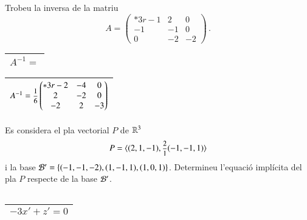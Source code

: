 \documentclass[11pt,catalan]{article}
\begin{document}
\begin{enunciat}
Trobeu la inversa de la matriu 
\[
  A = \begin{pmatrix}{*{3}r} -1 & 2 & 0\\ -1 & -1 & 0\\ 0 & -2 & -2\end{pmatrix}\,.
\]
\end{enunciat}

\begin{quadricula}
\begin{tabular}{|L{5cm}{1.25cm}|}
\hline
$A^{-1}=$ \\
\hline
\end{tabular}
\end{quadricula}

\begin{solucio}
\begin{center}
\begin{tabular}{|C{5cm}{1.25cm}|}
\hline
$A^{-1}=\deufrac{1}{6}\begin{pmatrix}{*{3}r} -2 & -4 & 0\\ 2 & -2 & 0\\ -2 & 2 & -3\end{pmatrix}$ \\
\hline
\end{tabular}
\end{center}
\end{solucio}


\begin{enunciat}
Es considera el pla vectorial $P$ de $\rn 3$
\[
  P = \langle (2,1,-1), \deufrac{2}{1}(-1,-1,1) \rangle
\]
i la base $\cal B'=\{(-1,-1,-2),(1,-1,1),(1,0,1)\}$. Determineu l'equació implícita del pla $P$ respecte de la base $\cal B'$.
\end{enunciat}

\begin{quadricula}
\begin{tabular}{|C{5cm}{0.5cm}|}
\hline
 \\
\hline
\end{tabular}
\end{quadricula}

\begin{solucio}
\begin{center}
\begin{tabular}{|C{5cm}{0.5cm}|}
\hline
$- 3 x' + z' = 0$ \\
\hline
\end{tabular}
\end{center}
\end{solucio}
\end{document}

